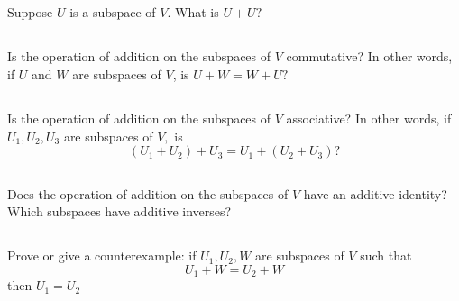 \documentclass[a4paper]{article}
\begin{document}
\paragraph{}

\subsection{}
Suppose $U$ is a subspace of $V .$ What is $U+U ?$
\paragraph{}

\subsection{}
Is the operation of addition on the subspaces of $V$ commutative? In other words, if $U$ and $W$ are subspaces of $V$, is $U+W=W+U ?$
\paragraph{}

\subsection{}
Is the operation of addition on the subspaces of $V$ associative? In other words, if $U_{1}, U_{2}, U_{3}$ are subspaces of $V,$ is
\[
    \left(U_{1}+U_{2}\right)+U_{3}=U_{1}+\left(U_{2}+U_{3}\right) ?
\]
\paragraph{}

\subsection{}
Does the operation of addition on the subspaces of $V$ have an additive identity? Which subspaces have additive inverses?
\paragraph{}

\subsection{}
Prove or give a counterexample: if $U_{1}, U_{2}, W$ are subspaces of $V$ such that
\[
    U_{1}+W=U_{2}+W
\]
then $U_{1}=U_{2}$
\paragraph{}
\end{document}

